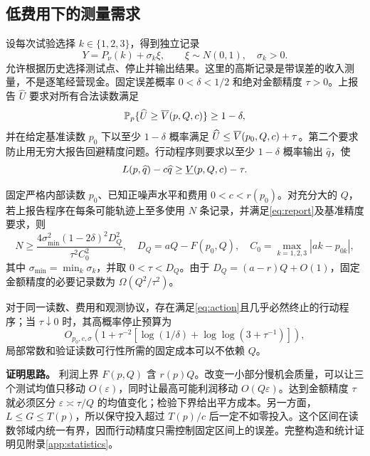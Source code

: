 \subsection{低费用下的测量需求}\label{sec:precision}
设每次试验选择 $k\in\{1,2,3\}$，得到独立记录
\begin{equation}\label{eq:gaussian}
 Y=P_\nu(k)+\sigma_k\xi,\qquad \xi\sim N(0,1),\quad \sigma_k>0.
\end{equation}
允许根据历史选择测试点、停止并输出结果。这里的高斯记录是带误差的收入测量，不是逐笔经营现金。固定误差概率 $0<\delta<1/2$ 和绝对金额精度 $\tau>0$。上报告 $\widehat U$ 要求对所有合法读数满足
\begin{equation}\label{eq:report}
 \mathbb P_p\{\widehat U\geq\overline V(p,Q,c)\}\geq1-\delta,
\end{equation}
并在给定基准读数 $p_0$ 下以至少 $1-\delta$ 概率满足 $\widehat U\leq\overline V(p_0,Q,c)+\tau$。第二个要求防止用无穷大报告回避精度问题。行动程序则要求以至少 $1-\delta$ 概率输出 $\widehat q$，使
\begin{equation}\label{eq:action}
 L(p,\widehat q)-c\widehat q\geq\underline V(p,Q,c)-\tau.
\end{equation}

\begin{theorem}[最大部署规模对两种精度要求的不同影响]\label{thm:precision}
固定严格内部读数 $p_0$、已知正噪声水平和费用 $0<c<r(p_0)$。对充分大的 $Q$，若上报告程序在每条可能轨迹上至多使用 $N$ 条记录，并满足\eqref{eq:report}及基准精度要求，则
\begin{equation}\label{eq:lowerN}
 N\geq\frac{4\sigma_{\min}^2(1-2\delta)^2D_Q^2}{\tau^2C_0^2},
 \quad D_Q=aQ-F(p_0,Q),\quad
 C_0=\max_{k=1,2,3}|ak-p_{0k}|,
\end{equation}
其中 $\sigma_{\min}=\min_k\sigma_k$，并取 $0<\tau<D_Q$。由于 $D_Q=(a-r)Q+O(1)$，固定金额精度的必要记录数为 $\Omega(Q^2/\tau^2)$。

对于同一读数、费用和观测协议，存在满足\eqref{eq:action}且几乎必然终止的行动程序；当 $\tau\downarrow0$ 时，其高概率停止预算为
\begin{equation}\label{eq:actionN}
 O_{p_0,c,\sigma}\!\left(1+\tau^{-2}
 \left[\log(1/\delta)+\log\log(3+\tau^{-1})\right]\right),
\end{equation}
局部常数和验证读数可行性所需的固定成本可以不依赖 $Q$。
\end{theorem}

\noindent\textbf{证明思路。}
利润上界 $F(p,Q)$ 含 $r(p)Q$。改变一小部分慢机会质量，可以让三个测试均值只移动 $O(\varepsilon)$，同时让最高可能利润移动 $O(Q\varepsilon)$。达到金额精度 $\tau$ 就必须区分 $\varepsilon\asymp\tau/Q$ 的均值变化；检验下界给出平方成本。另一方面，$L\leq G\leq T(p)$，所以保守投入超过 $T(p)/c$ 后一定不如零投入。这个区间在读数邻域内统一有界，因而行动精度只需控制固定区间上的误差。完整构造和统计证明见附录\ref{app:statistics}。

